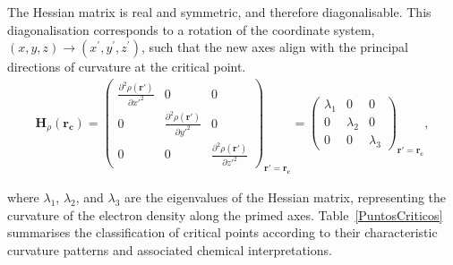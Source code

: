 \pagebreak
The Hessian matrix is real and symmetric, and therefore diagonalisable. This
diagonalisation corresponds to a rotation of the coordinate system,
$(x, y, z) \rightarrow (x^{\prime}, y^{\prime}, z^{\prime})$, such that the new
axes align with the principal directions of curvature at the critical point.
\begin{align}
  \mathbf{H}_\rho(\mathbf{r_c}) = \begin{pmatrix}
    \frac{\partial^2\rho(\mathbf{r}')}{\partial x'^2} & 0 & 0 \\
    0 & \frac{\partial^2\rho(\mathbf{r}')}{\partial y'^2} & 0 \\
    0 & 0 & \frac{\partial^2\rho(\mathbf{r}')}{\partial z'^2}
  \end{pmatrix}_{\mathbf{r}' = \mathbf{r_c}} =
  \begin{pmatrix}
    \lambda_1 & 0 & 0 \\
    0 & \lambda_2 & 0 \\
    0 & 0 & \lambda_3
  \end{pmatrix}_{\mathbf{r}' = \mathbf{r_c}} ,
\end{align}

\noindent where $\lambda_1$, $\lambda_2$, and $\lambda_3$ are the eigenvalues
of the Hessian matrix, representing the curvature of the electron density along
the primed axes. Table~\ref{PuntosCriticos} summarises the classification of
critical points according to their characteristic curvature patterns and
associated chemical interpretations.

